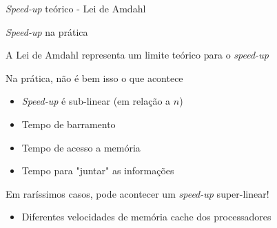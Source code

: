\documentclass[compress]{beamer}
\begin{document}
\begin{frame}{\textit{Speed-up} teórico - Lei de Amdahl}

\begin{table}[]
\centering
{}
\end{table}
\end{frame}


\begin{frame}{\textit{Speed-up} na prática}

A Lei de Amdahl representa um limite teórico para o \textit{speed-up}

\vspace{0.5cm}

Na prática, não é bem isso o que acontece
\begin{itemize}
    \item \textit{Speed-up} é sub-linear (em relação a $n$)
    \item Tempo de barramento
    \item Tempo de acesso a memória
    \item Tempo para "juntar" as informações
\end{itemize}

\vspace{0.5cm}

Em raríssimos casos, pode acontecer um \textit{speed-up} super-linear!
\begin{itemize}
    \item Diferentes velocidades de memória cache dos processadores
\end{itemize}
\end{frame}
\end{document}
